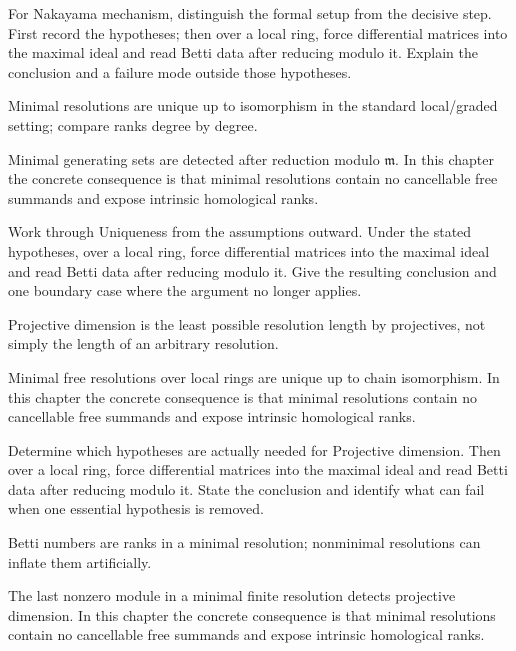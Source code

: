 \begin{exercise}\label{exr:v25-05}
For Nakayama mechanism, distinguish the formal setup from the decisive step. First record the hypotheses; then over a local ring, force differential matrices into the maximal ideal and read Betti data after reducing modulo it. Explain the conclusion and a failure mode outside those hypotheses.
\end{exercise}
\begin{hint}
Minimal resolutions are unique up to isomorphism in the standard local/graded setting; compare ranks degree by degree.
\end{hint}
\begin{solution}
Minimal generating sets are detected after reduction modulo $\mathfrak m$. In this chapter the concrete consequence is that minimal resolutions contain no cancellable free summands and expose intrinsic homological ranks.
\end{solution}

\begin{exercise}\label{exr:v25-06}
Work through Uniqueness from the assumptions outward. Under the stated hypotheses, over a local ring, force differential matrices into the maximal ideal and read Betti data after reducing modulo it. Give the resulting conclusion and one boundary case where the argument no longer applies.
\end{exercise}
\begin{hint}
Projective dimension is the least possible resolution length by projectives, not simply the length of an arbitrary resolution.
\end{hint}
\begin{solution}
Minimal free resolutions over local rings are unique up to chain isomorphism. In this chapter the concrete consequence is that minimal resolutions contain no cancellable free summands and expose intrinsic homological ranks.
\end{solution}

\begin{exercise}\label{exr:v25-07}
Determine which hypotheses are actually needed for Projective dimension. Then over a local ring, force differential matrices into the maximal ideal and read Betti data after reducing modulo it. State the conclusion and identify what can fail when one essential hypothesis is removed.
\end{exercise}
\begin{hint}
Betti numbers are ranks in a minimal resolution; nonminimal resolutions can inflate them artificially.
\end{hint}
\begin{solution}
The last nonzero module in a minimal finite resolution detects projective dimension. In this chapter the concrete consequence is that minimal resolutions contain no cancellable free summands and expose intrinsic homological ranks.
\end{solution}


